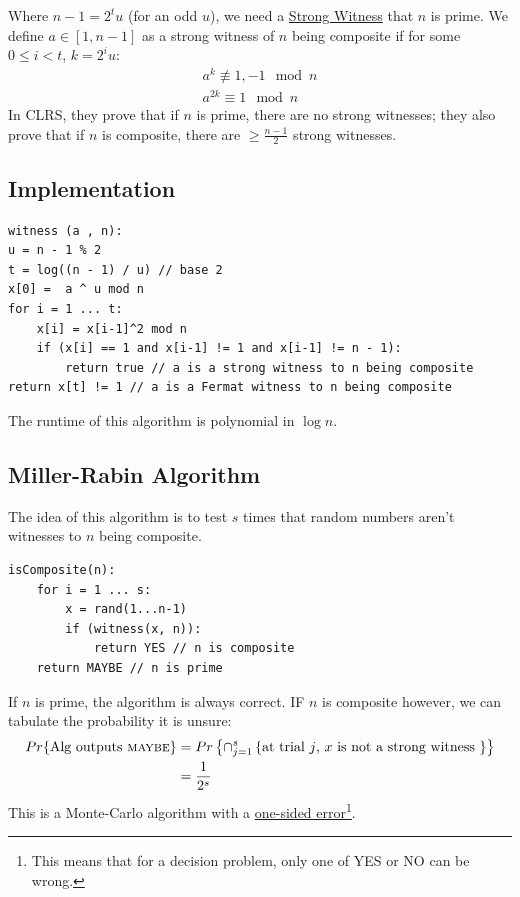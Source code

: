                     Where $n-1 = 2^t u$ (for an odd $u$), we need a \uline{Strong Witness} that $n$ is prime.
                    We define $a \in [1, n-1]$ as a strong witness of $n$ being composite if for some $0 \le i < t$, $k = 2^i u$:
                    \begin{align*}
                        a^k \not \equiv 1 , -1 \mod n \\
                        a^{2k} \equiv 1 \mod n
                    \end{align*}
                    In CLRS, they prove that if $n$ is prime, there are no strong witnesses;
                    they also prove that if $n$ is composite, there are $\ge \frac{n-1}{2}$ strong witnesses.
                \subsection{Implementation} %
                \label{sub:implementation}
                    \begin{lstlisting}
witness (a , n):
u = n - 1 % 2
t = log((n - 1) / u) // base 2
x[0] =  a ^ u mod n
for i = 1 ... t:
    x[i] = x[i-1]^2 mod n
    if (x[i] == 1 and x[i-1] != 1 and x[i-1] != n - 1):
        return true // a is a strong witness to n being composite
return x[t] != 1 // a is a Fermat witness to n being composite
                    \end{lstlisting}
                    The runtime of this algorithm is polynomial in $\log n$.
                \subsection{Miller-Rabin Algorithm} %
                \label{sub:miller_rabin_algorithm}
                    The idea of this algorithm is to test $s$ times that random numbers aren't witnesses to $n$ being composite.
                    \begin{lstlisting}
isComposite(n):
    for i = 1 ... s:
        x = rand(1...n-1)
        if (witness(x, n)):
            return YES // n is composite
    return MAYBE // n is prime
                    \end{lstlisting}
                    If $n$ is prime, the algorithm is always correct.
                    IF $n$ is composite however, we can tabulate the probability it is unsure:
                    \begin{align*}
                        Pr\{ \text{Alg outputs \textsc{maybe}}\} &= Pr\left\{ \cap_{j=1}^s \left\{\text{at trial $j$, $x$ is not a strong witness } \right\} \right\} \\
                        &= \frac{1}{2^s}
                    \end{align*}
                    This is a Monte-Carlo algorithm with a \uline{one-sided error}\footnote{This means that for a decision problem, only one of \textsc{YES} or \textsc{NO} can be wrong.}.
